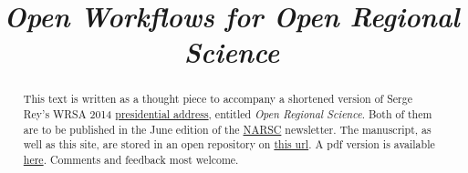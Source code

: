 
\title{\textit{Open Workflows for Open Regional Science}}
\maketitle
\renewcommand{\abstractname}{\href{http://darribas.org}{[Dani Arribas-Bel]}}
\begin{abstract}
          This text is written as a thought piece to accompany a shortened version
          of Serge Rey's WRSA 2014 \href{https://github.com/sjsrey/ors}{
          presidential address}, entitled \textit{Open Regional Science}. Both of them are to be
          published in the June edition of the \href{http://narsc.org"}{NARSC} newsletter.
          The manuscript, as well as this site, are stored in an open
          repository on \href{https://github.com/darribas/ow4ors/}{this
          url}. A pdf version is available
          \href{https://github.com/darribas/ow4ors/blob/gh-pages/ow4ors.pdf}{here}. Comments and feedback most welcome.

\end{abstract}

